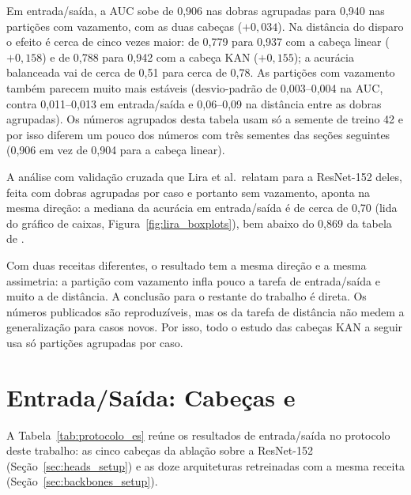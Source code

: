 Em entrada/saída, a AUC sobe de 0,906 nas dobras agrupadas para 0,940 nas partições com vazamento, com as duas cabeças ($+0{,}034$). Na distância do disparo o efeito é cerca de cinco vezes maior: de 0,779 para 0,937 com a cabeça linear ($+0{,}158$) e de 0,788 para 0,942 com a cabeça KAN ($+0{,}155$); a acurácia balanceada vai de cerca de 0,51 para cerca de 0,78. As partições com vazamento também parecem muito mais estáveis (desvio-padrão de 0,003--0,004 na AUC, contra 0,011--0,013 em entrada/saída e 0,06--0,09 na distância entre as dobras agrupadas). Os números agrupados desta tabela usam só a semente de treino 42 e por isso diferem um pouco dos números com três sementes das seções seguintes (0,906 em vez de 0,904 para a cabeça linear).

A análise com validação cruzada que Lira et al.\ relatam para a ResNet-152 deles, feita com dobras agrupadas por caso e portanto sem vazamento, aponta na mesma direção: a mediana da acurácia em entrada/saída é de cerca de 0,70 (lida do gráfico de caixas, Figura~\ref{fig:lira_boxplots}), bem abaixo do 0,869 da tabela de .


Com duas receitas diferentes, o resultado tem a mesma direção e a mesma assimetria: a partição com vazamento infla pouco a tarefa de entrada/saída e muito a de distância. A conclusão para o restante do trabalho é direta. Os números publicados são reproduzíveis, mas os da tarefa de distância não medem a generalização para casos novos. Por isso, todo o estudo das cabeças KAN a seguir usa só partições agrupadas por caso.

\section{Entrada/Saída: Cabeças e \texorpdfstring{}{Backbones}}
\label{sec:results_entry_exit}

A Tabela~\ref{tab:protocolo_es} reúne os resultados de entrada/saída no protocolo deste trabalho: as cinco cabeças da ablação sobre a ResNet-152 (Seção~\ref{sec:heads_setup}) e as doze arquiteturas retreinadas com a mesma receita (Seção~\ref{sec:backbones_setup}).

